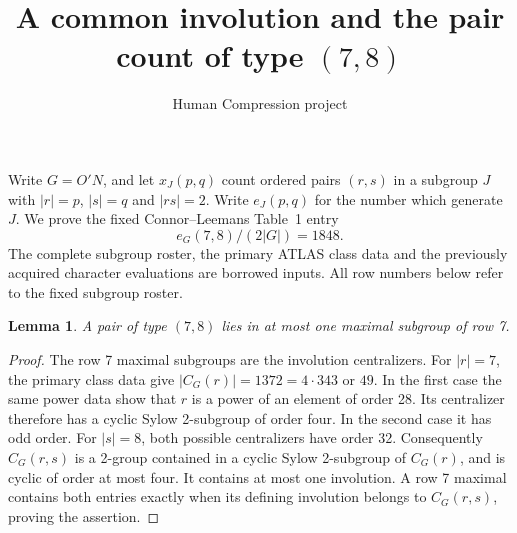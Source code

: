 \documentclass[11pt,a4paper]{article}
\title{A common involution and the pair count of type $(7,8)$}
\author{Human Compression project}\date{}
\newtheorem{lemma}{Lemma}\newtheorem{theorem}{Theorem}
\begin{document}
\maketitle
Write $G=O'N$, and let $x_J(p,q)$ count ordered pairs $(r,s)$ in a
subgroup $J$ with $|r|=p$, $|s|=q$ and $|rs|=2$. Write $e_J(p,q)$
for the number which generate $J$. We prove the fixed Connor--Leemans
Table~1 entry
\[                         e_G(7,8)/(2|G|)=1848.                 \tag{1}\]
The complete subgroup roster, the primary ATLAS class data and the
previously acquired character evaluations are borrowed inputs.
All row numbers below refer to the fixed subgroup roster.

\begin{lemma}\label{atmost}
A pair of type $(7,8)$ lies in at most one maximal subgroup of row 7.
\end{lemma}
\begin{proof}
The row 7 maximal subgroups are the involution centralizers. For
$|r|=7$, the primary class data give $|C_G(r)|=1372=4\cdot343$ or
$49$. In the first case the same power data show that $r$ is a power
of an element of order 28. Its centralizer therefore has a cyclic
Sylow 2-subgroup of order four. In the second case it has odd order.
For $|s|=8$, both possible centralizers have order 32. Consequently
$C_G(r,s)$ is a 2-group contained in a cyclic Sylow 2-subgroup of
$C_G(r)$, and is cyclic of order at most four. It contains at most
one involution. A row 7 maximal contains both entries exactly when
its defining involution belongs to $C_G(r,s)$, proving the assertion.
\end{proof}
\end{document}
